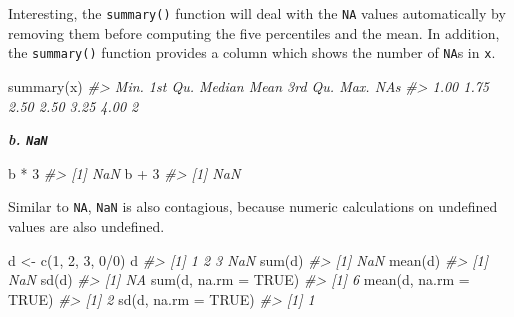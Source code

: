 \documentclass[
]{book}
\newenvironment{Shaded}{\begin{snugshade}}{\end{snugshade}}
\newcommand{\AttributeTok}[1]{\textcolor[rgb]{0.77,0.63,0.00}{#1}}
\newcommand{\CommentTok}[1]{\textcolor[rgb]{0.56,0.35,0.01}{\textit{#1}}}
\newcommand{\ConstantTok}[1]{\textcolor[rgb]{0.00,0.00,0.00}{#1}}
\newcommand{\DecValTok}[1]{\textcolor[rgb]{0.00,0.00,0.81}{#1}}
\newcommand{\FunctionTok}[1]{\textcolor[rgb]{0.00,0.00,0.00}{#1}}
\newcommand{\NormalTok}[1]{#1}
\newcommand{\OtherTok}[1]{\textcolor[rgb]{0.56,0.35,0.01}{#1}}
\newcommand{\SpecialCharTok}[1]{\textcolor[rgb]{0.00,0.00,0.00}{#1}}
\begin{document}
Interesting, the \texttt{summary()} function will deal with the \texttt{NA} values automatically by removing them before computing the five percentiles and the mean. In addition, the \texttt{summary()} function provides a column which shows the number of \texttt{NA}s in \texttt{x}.

\begin{Shaded}
\begin{Highlighting}[]
\FunctionTok{summary}\NormalTok{(x) }
\CommentTok{\#\textgreater{}    Min. 1st Qu.  Median    Mean 3rd Qu.    Max.    NA\textquotesingle{}s }
\CommentTok{\#\textgreater{}    1.00    1.75    2.50    2.50    3.25    4.00       2}
\end{Highlighting}
\end{Shaded}

\textbf{\emph{b. \texttt{NaN} }}

\begin{Shaded}
\begin{Highlighting}[]
\NormalTok{b }\SpecialCharTok{*} \DecValTok{3}
\CommentTok{\#\textgreater{} [1] NaN}
\NormalTok{b }\SpecialCharTok{+} \DecValTok{3}
\CommentTok{\#\textgreater{} [1] NaN}
\end{Highlighting}
\end{Shaded}

Similar to \texttt{NA}, \texttt{NaN} is also contagious, because numeric calculations on undefined values are also undefined.

\begin{Shaded}
\begin{Highlighting}[]
\NormalTok{d }\OtherTok{\textless{}{-}} \FunctionTok{c}\NormalTok{(}\DecValTok{1}\NormalTok{, }\DecValTok{2}\NormalTok{, }\DecValTok{3}\NormalTok{, }\DecValTok{0}\SpecialCharTok{/}\DecValTok{0}\NormalTok{)}
\NormalTok{d}
\CommentTok{\#\textgreater{} [1]   1   2   3 NaN}
\FunctionTok{sum}\NormalTok{(d) }
\CommentTok{\#\textgreater{} [1] NaN}
\FunctionTok{mean}\NormalTok{(d)}
\CommentTok{\#\textgreater{} [1] NaN}
\FunctionTok{sd}\NormalTok{(d)}
\CommentTok{\#\textgreater{} [1] NA}
\FunctionTok{sum}\NormalTok{(d, }\AttributeTok{na.rm =} \ConstantTok{TRUE}\NormalTok{) }
\CommentTok{\#\textgreater{} [1] 6}
\FunctionTok{mean}\NormalTok{(d, }\AttributeTok{na.rm =} \ConstantTok{TRUE}\NormalTok{)}
\CommentTok{\#\textgreater{} [1] 2}
\FunctionTok{sd}\NormalTok{(d, }\AttributeTok{na.rm =} \ConstantTok{TRUE}\NormalTok{)}
\CommentTok{\#\textgreater{} [1] 1}
\end{Highlighting}
\end{Shaded}
\end{document}
